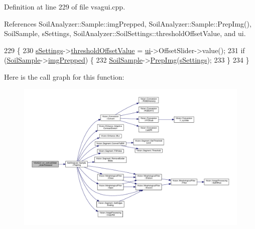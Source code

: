 Definition at line 229 of file vsagui.\+cpp.



References Soil\+Analyzer\+::\+Sample\+::img\+Prepped, Soil\+Analyzer\+::\+Sample\+::\+Prep\+Img(), Soil\+Sample, s\+Settings, Soil\+Analyzer\+::\+Soil\+Settings\+::threshold\+Offset\+Value, and ui.


\begin{DoxyCode}
229                                               \{
230   \hyperlink{class_v_s_a_g_u_i_a4a0358d00aa3cb520a9a1321962b0d4d}{sSettings}->\hyperlink{class_soil_analyzer_1_1_soil_settings_a48330eb812672b50a94483f264614e8f}{thresholdOffsetValue} = \hyperlink{class_v_s_a_g_u_i_a7a1d0cb3cf813ff9dce12f7f0ed6cd7a}{ui}->OffsetSlider->value();
231   \textcolor{keywordflow}{if} (\hyperlink{class_v_s_a_g_u_i_ac90517c9baea0a75455d43d5eb77d3e7}{SoilSample}->\hyperlink{class_soil_analyzer_1_1_sample_ab025a26f7276128a5a974cae15b51dfc}{imgPrepped}) \{
232     \hyperlink{class_v_s_a_g_u_i_ac90517c9baea0a75455d43d5eb77d3e7}{SoilSample}->\hyperlink{class_soil_analyzer_1_1_sample_a23050a1fff3e11e907657623756333b2}{PrepImg}(\hyperlink{class_v_s_a_g_u_i_a4a0358d00aa3cb520a9a1321962b0d4d}{sSettings});
233   \}
234 \}
\end{DoxyCode}


Here is the call graph for this function\+:\nopagebreak
\begin{figure}[H]
\begin{center}
\leavevmode
\includegraphics[width=350pt]{class_v_s_a_g_u_i_a161ef77cd94b239874ea35079aec9eb4_cgraph}
\end{center}
\end{figure}


\hypertarget{class_v_s_a_g_u_i_a8a5092f741e17c73b04850a6b30dda04}{}
